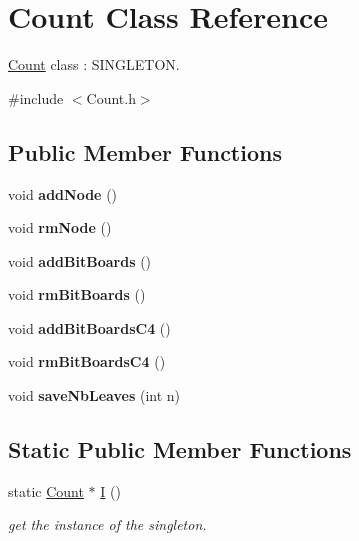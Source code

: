 \hypertarget{class_count}{\section{Count Class Reference}
\label{class_count}
}


\hyperlink{class_count}{Count} class \+: S\+I\+N\+G\+L\+E\+T\+O\+N.  




{\ttfamily \#include $<$Count.\+h$>$}

\subsection*{Public Member Functions}
\begin{DoxyCompactItemize}
\item 
\hypertarget{class_count_ac241be1bbf72b86c11a6a79fcd812724}{void {\bfseries add\+Node} ()}\label{class_count_ac241be1bbf72b86c11a6a79fcd812724}

\item 
\hypertarget{class_count_ad74cf185857922562983a280e9cec110}{void {\bfseries rm\+Node} ()}\label{class_count_ad74cf185857922562983a280e9cec110}

\item 
\hypertarget{class_count_ac1a58a2bc52907087e4c367a6bef753a}{void {\bfseries add\+Bit\+Boards} ()}\label{class_count_ac1a58a2bc52907087e4c367a6bef753a}

\item 
\hypertarget{class_count_a5ba88d4c0b7570a7393fc681ba050142}{void {\bfseries rm\+Bit\+Boards} ()}\label{class_count_a5ba88d4c0b7570a7393fc681ba050142}

\item 
\hypertarget{class_count_a6ad9b620f8b6708db5035ceb6bd10c3d}{void {\bfseries add\+Bit\+Boards\+C4} ()}\label{class_count_a6ad9b620f8b6708db5035ceb6bd10c3d}

\item 
\hypertarget{class_count_a15364328213f35293cb781a56f73bb08}{void {\bfseries rm\+Bit\+Boards\+C4} ()}\label{class_count_a15364328213f35293cb781a56f73bb08}

\item 
\hypertarget{class_count_a446c264e35638ee316d4c406b1e28b27}{void {\bfseries save\+Nb\+Leaves} (int n)}\label{class_count_a446c264e35638ee316d4c406b1e28b27}

\end{DoxyCompactItemize}
\subsection*{Static Public Member Functions}
\begin{DoxyCompactItemize}
\item 
static \hyperlink{class_count}{Count} $\ast$ \hyperlink{class_count_af89f83b7ba1bdbed817c4408a753f436}{I} ()
\begin{DoxyCompactList}\small\item\em get the instance of the singleton. \end{DoxyCompactList}\end{DoxyCompactItemize}
